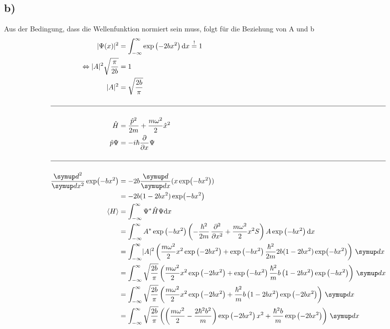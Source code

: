 \subsection{b)}
    Aus der Bedingung, dass die Wellenfunktion normiert sein muss, folgt für die Beziehung von A und b
    \begin{align}
        \abs{\Psi(x)}^2 &= \int_{-\infty}^{\infty} \exp\left( -2bx^2 \right) \mathrm{d}x \stackrel{!}{=} 1\\
        \Leftrightarrow \abs{A}^2 \sqrt{\frac{\pi}{2b}} &= 1\\
        \abs{A}^2 &= \sqrt{\frac{2b}{\pi}}\\
        \nonumber\\
        \hline \nonumber \\
        \hat{H} &= \frac{\hat{p}^2}{2m} + \frac{m\omega^2}{2}\hat{x}^2\\
        \hat{p} \Psi &= -i\hbar \frac{\partial}{\partial x} \Psi\\
        \nonumber\\
        \hline \nonumber \\
        \frac{\dif{}^2}{\dif{x^2}} \exp(-bx^2) &= -2b \frac{\dif{}}{\dif{x}}(x \exp(-bx^2))\\
        &= -2b (1-2bx^2) \exp (-bx^2)\\
        \langle H \rangle &= \int_{-\infty}^{\infty} \Psi^* \hat{H} \Psi \mathrm{d}x\\
        &= \int_{-\infty}^{\infty} A^* \exp\left( -bx^2 \right) \left( -\frac{\hbar^2}{2m} \deln{}{x}{2} + \frac{m\omega^2}{2} x^2S \right) A \exp\left( -bx^2 \right) \mathrm{d}x\\
        &= \int_{-\infty}^{\infty} \abs{A}^2 \left( \frac{m\omega^2}{2} x^2 \exp\left( -2bx^2 \right) + \exp\left( -bx^2 \right) \frac{\hbar^2}{2m} 2b (1-2bx^2) \exp (-bx^2) \right) \,\dif{x}\\
        &= \int_{-\infty}^{\infty} \sqrt{\frac{2b}{\pi}} \left( \frac{m\omega^2}{2} x^2 \exp\left( -2bx^2 \right) + \exp\left( -bx^2 \right) \frac{\hbar^2}{m} b \left( 1-2bx^2 \right) \exp\left( -bx^2 \right) \right) \,\dif{x}\\
        &= \int_{-\infty}^{\infty} \sqrt{\frac{2b}{\pi}} \left( \frac{m\omega^2}{2} x^2 \exp\left( -2bx^2 \right) + \frac{\hbar^2}{m} b \left( 1-2bx^2 \right) \exp\left( -2bx^2 \right) \right) \,\dif{x}\\
        &= \int_{-\infty}^{\infty} \sqrt{\frac{2b}{\pi}} \left( \left( \frac{m\omega^2}{2} - \frac{2\hbar^2 b^2}{m} \right) \exp\left( -2bx^2 \right) x^2 + \frac{\hbar^2 b}{m} \exp\left( -2bx^2 \right) \right) \,\dif{x}\\

\end{align}
